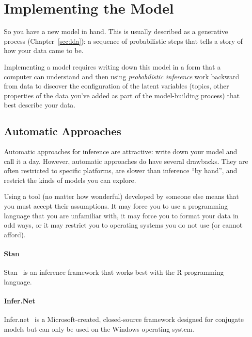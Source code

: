 \section{Implementing the Model}

So you have a new model in hand.  This is usually described as a
generative process (Chapter~\ref{sec:lda}): a sequence of probabilistic steps
that tells a story of how your data came to be.

Implementing a model requires writing down this model in a form that a
computer can understand and then using \emph{probabilistic inference}
work backward from data to discover the configuration of the latent
variables (topics, other properties of the data you've added as part
of the model-building process) that best describe your data.

\subsection{Automatic Approaches}

Automatic approaches for inference are attractive: write down your
model and call it a day.  However, automatic approaches do have several drawbacks.  They are
often restricted to specific platforms, are slower than inference ``by
hand'', and restrict the kinds of models you can explore.

Using a tool (no matter how wonderful) developed by someone else means
that you must accept their assumptions.  It may force you to use a
programming language that you are unfamiliar with, it may force you to
format your data in odd ways, or it may restrict you to operating
systems you do not use (or cannot afford).


\paragraph{Stan}

Stan~\citep{stan-software:2014} is an inference framework that works best with the R programming
language.

\paragraph{Infer.Net}

Infer.net~\citep{InferNET14} is a Microsoft-created, closed-source
framework designed for conjugate
models but can only be used on the Windows operating system.

